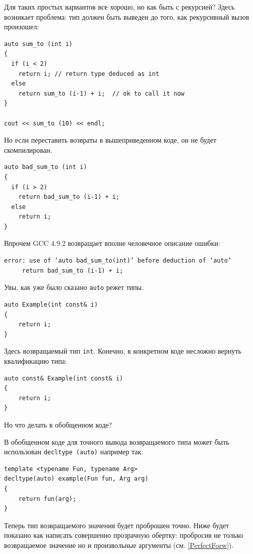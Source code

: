 \documentclass[a4paper,12pt,oneside]{article}
\begin{document}
Для таких простых вариантов все хорошо, но как быть с рекурсией? Здесь возникает проблема: тип должен быть выведен до того, как рекурсивный вызов произошел:

\begin{lstlisting}
auto sum_to (int i)
{
  if (i < 2)
    return i; // return type deduced as int
  else
    return sum_to (i-1) + i;  // ok to call it now
}

cout << sum_to (10) << endl;
\end{lstlisting}

Но если переставить возвраты в вышеприведенном коде, он не будет скомпилирован.

\begin{lstlisting}
auto bad_sum_to (int i)
{
  if (i > 2)
    return bad_sum_to (i-1) + i;
  else
    return i;
}
\end{lstlisting}

Впрочем GCC 4.9.2 возвращает вполне человечное описание ошибки:

\begin{verbatim}
error: use of ‘auto bad_sum_to(int)’ before deduction of ‘auto’
     return bad_sum_to (i-1) + i;
\end{verbatim}

Увы, как уже было сказано \lstinline!auto! режет типы. 

\begin{lstlisting}
auto Example(int const& i) 
{ 
    return i; 
}
\end{lstlisting}

Здесь возвращаемый тип \lstinline!int!. Конечно, в конкретном коде несложно вернуть квалификацию типа:

\begin{lstlisting}
auto const& Example(int const& i) 
{ 
    return i; 
}
\end{lstlisting}

Но что делать в обобщенном коде?

В обобщенном коде для точного вывода возвращаемого типа может быть использован \lstinline!decltype (auto)! например так:

\begin{lstlisting}
template <typename Fun, typename Arg>
decltype(auto) example(Fun fun, Arg arg) 
{ 
    return fun(arg); 
}
\end{lstlisting}

Теперь тип возвращаемого значения будет проброшен точно. Ниже будет показано как написать совершенно прозрачную обертку: пробросив не только возвращаемое значение но и произвольные аргументы (см. \ref{PerfectForw}).
\end{document}
